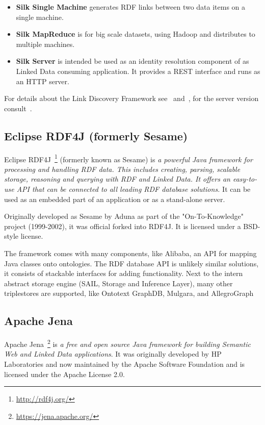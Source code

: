 \begin{itemize}
\item \textbf{Silk Single Machine} generates RDF links between two data items on a single machine.
\item \textbf{Silk MapReduce} is for big scale datasets, using Hadoop and distributes to multiple machines.
\item \textbf{Silk Server} is intended be used as an identity resolution component of as Linked Data consuming application. It provides a REST interface and runs as an HTTP server.
\end{itemize}

For details about the Link Discovery Framework see~\cite{volz2009silk} and~\cite{jentzsch2010silk}, for the server version consult~\cite{isele2010silk}.

\subsection{Eclipse RDF4J (formerly Sesame)}
Eclipse RDF4J~\footnote{\url{http://rdf4j.org/}} (formerly known as Sesame) is \emph{a powerful Java framework for processing and handling RDF data. This includes creating, parsing, scalable storage, reasoning and querying with RDF and Linked Data. It offers an easy-to-use API that can be connected to all leading RDF database solutions.} It can be used as an embedded part of an application or as a stand-alone server.

Originally developed as Sesame by Aduna as part of the "On-To-Knowledge" project (1999-2002), it was official forked into RDF4J. It is licensed under a BSD-style license.

The framework comes with many components, like Alibaba, an API for mapping Java classes onto ontologies. The RDF database API is unlikely similar solutions, it consists of stackable interfaces for adding functionality. Next to the intern abstract storage engine (SAIL, Storage and Inference Layer), many other triplestores are supported, like  Ontotext GraphDB, Mulgara, and AllegroGraph

\subsection{Apache Jena}

Apache Jena~\footnote{\url{https://jena.apache.org/}} is \emph{a free and open source Java framework for building Semantic Web and Linked Data applications}. It was originally developed by HP Laboratories and now maintained by the Apache Software Foundation and is licensed under the Apache License 2.0.

